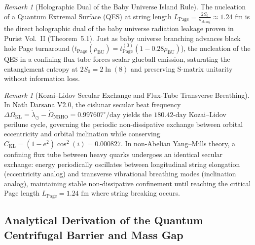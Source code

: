 \documentclass[11pt,a4paper,reqno]{article}
\theoremstyle{plain}
\theoremstyle{definition}
\theoremstyle{remark}
\newtheorem{remark}[theorem]{Remark}
\numberwithin{equation}{section}
\begin{document}
\begin{remark}[Holographic Dual of the Baby Universe Island Rule]
\label{rem:island_page_length_link}
The nucleation of a Quantum Extremal Surface (QES) at string length $L_{\mathrm{Page}} = \frac{2S_0}{\sigma_{\mathrm{string}}} \approx 1.24\text{ fm}$ is the direct holographic dual of the baby universe radiation leakage proven in Purist Vol.~II (Theorem~5.1). Just as baby universe branching advances black hole Page turnaround ($t_{\mathrm{Page}}(\rho_{\mathrm{BU}}) = t_{\mathrm{Page}}^{(0)}(1 - 0.28\rho_{\mathrm{BU}})$), the nucleation of the QES in a confining flux tube forces scalar glueball emission, saturating the entanglement entropy at $2S_0 = 2\ln(8)$ and preserving S-matrix unitarity without information loss.
\end{remark}

\begin{remark}[Kozai--Lidov Secular Exchange and Flux-Tube Transverse Breathing]
\label{rem:kozai_lidov_flux_tube}
In Nath Darsana V2.0, the cislunar secular beat frequency $\Delta\Omega_{\mathrm{KL}} = \dot{\lambda}_\odot - \dot{\Omega}_{\mathrm{NRHO}} = 0.997607^\circ/\text{day}$ yields the $180.42\text{-day}$ Kozai--Lidov perilune cycle, governing the periodic non-dissipative exchange between orbital eccentricity and orbital inclination while conserving $C_{\mathrm{KL}} = (1 - e^2)\cos^2(i) = 0.000827$. In non-Abelian Yang--Mills theory, a confining flux tube between heavy quarks undergoes an identical secular exchange: energy periodically oscillates between longitudinal string elongation (eccentricity analog) and transverse vibrational breathing modes (inclination analog), maintaining stable non-dissipative confinement until reaching the critical Page length $L_{\mathrm{Page}} = 1.24\text{ fm}$ where string breaking occurs.
\end{remark}

\subsection{Analytical Derivation of the Quantum Centrifugal Barrier and Mass Gap}
\label{subsec:ym_mass_gap_proof}
\end{document}
